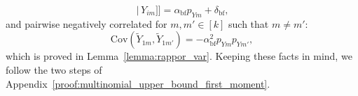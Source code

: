\documentclass[twoside,11pt]{article}
\newcommand{\rvTwo}{Y}
\newcommand{\sampleIndexOne}{i}
\newcommand{\vectorIndex}{m}
\newcommand{\probVecElement}[2]{p_{{#1}{#2}}}
\newcommand{\privacyParameter}{\alpha} %
\newcommand{\privacyParameterrappor}{\privacyParameter_{\mathrm{bf}}}
\newcommand{\smallNumber}{\delta}
\newcommand{\smallNumberrappor}{\smallNumber_{\mathrm{bf}}}
\begin{document}
\begin{appendix}
\begin{equation}
		\,\big|\, %
		\rvTwo_{\sampleIndexOne \vectorIndex}] 
		\bigr]
		=
		\privacyParameterrappor 
		\probVecElement{\rvTwo}{\vectorIndex}
		+ \smallNumberrappor,	
	\end{equation}
	and pairwise negatively correlated for $m, m' \in [k]$ such that $m \neq m'$:
	\begin{equation}\label{cov_neg}
		\mathrm{Cov}(\tilde{Y}_{1\vectorIndex}, \tilde{Y}_{1\vectorIndex'})
		=
		-
		\privacyParameterrappor^2
		\probVecElement{\rvTwo}{\vectorIndex}
		\probVecElement{\rvTwo}{\vectorIndex'},
	\end{equation}
	\noindent
	which is proved in Lemma~\ref{lemma:rappor_var}.
	Keeping these facts in mind, we follow the two steps of Appendix~\ref{proof:multinomial_upper_bound_first_moment}.
	
	
	
	

\end{appendix}
\end{document}
